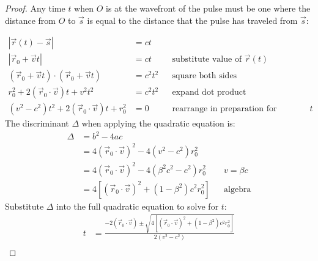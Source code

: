 \documentclass[a4paper]{article}
\theoremstyle{plain}
\theoremstyle{definition}
\newcommand{\vect}[1]{\vec{#1}}
\begin{document}
\begin{proof}
Any time $t$ when $O$ is at the wavefront of the pulse must be one
where the distance from $O$ to $\vect{s}$ is equal to the distance
that the pulse has traveled from $\vect{s}$:

\begin{align*}
|\vect{r}(t) - \vect{s}| & = ct \\
|\vect{r}_0 + \vect{v}t| & = ct & & \text{substitute value of $\vect{r}(t)$} \\
(\vect{r}_0 + \vect{v}t) \cdot (\vect{r}_0 + \vect{v}t) & = c^2t^2 & & \text{square both sides} \\
r_0^2 + 2(\vect{r}_0 \cdot \vect{v})t + v^2t^2 & = c^2t^2 & & \text{expand dot product} \\
(v^2-c^2)t^2 + 2(\vect{r}_0 \cdot \vect{v})t + r_0^2 & = 0 & & \text{rearrange in preparation for quadratic equation on $t$}
\end{align*}
The discriminant $\Delta$ when applying the quadratic equation is:
\begin{align*}
\Delta
  & = b^2 - 4ac \\
  & = 4(\vect{r}_0 \cdot \vect{v})^2 - 4(v^2 - c^2)r_0^2 \\
  & = 4(\vect{r}_0 \cdot \vect{v})^2 - 4(\beta^2 c^2 - c^2)r_0^2 & & \text{$v=\beta c$} \\
  & = 4 \left[ (\vect{r}_0 \cdot \vect{v})^2 + (1-\beta^2)c^2 r_0^2 \right] & & \text{algebra}
\end{align*}
Substitute $\Delta$ into the full quadratic equation to solve for $t$:
\begin{align*}
t
  & = \frac{-2(\vect{r}_0 \cdot \vect{v}) \pm \sqrt{4 \left[ (\vect{r}_0 \cdot \vect{v})^2 + (1-\beta^2)c^2 r_0^2 \right]}}{2(v^2 - c^2)} \\

\end{align*}
\end{proof}
\end{document}
